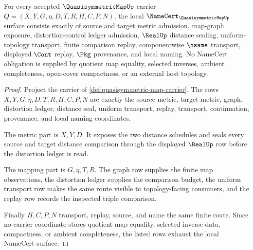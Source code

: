 \begin{theorem}
\label{thm:quasisymmetric-map-namecert-obligations}
For every accepted $\QuasisymmetricMapUp$ carrier $Q=(X,Y,G,\eta,D,T,R,H,C,P,N)$, the local $\NameCert_{\QuasisymmetricMapUp}$ surface consists exactly of source and target metric admission, map-graph exposure, distortion-control ledger admission, $\RealUp$ distance sealing, uniform-topology transport, finite comparison replay, componentwise $\hsame$ transport, displayed $\Cont$ replay, $\Pkg$ provenance, and local naming. No NameCert obligation is supplied by quotient map equality, selected inverses, ambient completeness, open-cover compactness, or an external host topology.
\end{theorem}
\begin{proof}
Project the carrier of \autoref{def:quasisymmetric-map-carrier}. The rows $X,Y,G,\eta,D,T,R,H,C,P,N$ are exactly the source metric, target metric, graph, distortion ledger, distance seal, uniform transport, replay, transport, continuation, provenance, and local naming coordinates.

The metric part is $X,Y,D$. It exposes the two distance schedules and seals every source and target distance comparison through the displayed $\RealUp$ row before the distortion ledger is read.

The mapping part is $G,\eta,T,R$. The graph row supplies the finite map observations, the distortion ledger supplies the comparison budget, the uniform transport row makes the same route visible to topology-facing consumers, and the replay row records the inspected triple comparison.

Finally $H,C,P,N$ transport, replay, source, and name the same finite route. Since no carrier coordinate stores quotient map equality, selected inverse data, compactness, or ambient completeness, the listed rows exhaust the local NameCert surface.
\end{proof}

